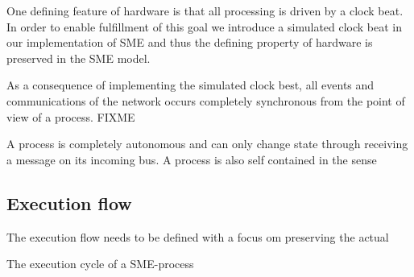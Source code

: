 \begin{property} One defining feature of
    hardware is that all processing is driven by a clock beat. In
    order to enable fulfillment of this goal we introduce a simulated
    clock beat in our implementation of SME and thus the defining
    property of hardware is preserved in the SME model.
\end{property}

\begin{property}
  \label{synchro}
  As a consequence of implementing the simulated clock best, all
  events and communications of the network occurs completely
  synchronous from the point of view of a process. FIXME
\end{property}

\begin{property}
  \label{noshare}
  A process is completely autonomous and can only change state through
  receiving a message on its incoming bus. A process is also self
  contained in the sense
\end{property}

\subsection{Execution flow}
The execution flow needs to be defined with a focus om preserving the
actual 

The execution cycle of a SME-process 


